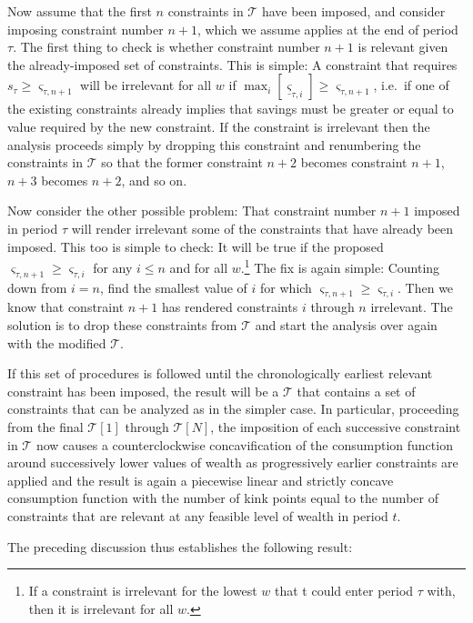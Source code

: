 \documentclass[titlepage]{\econtex}
\providecommand{\sConst}{\varsigma}
\begin{document}
  Now assume that the first $n$ constraints in $\mathcal{T}$ have been imposed, and consider imposing constraint number $n+1$, which we assume applies at the end of period $\tau$.  The first thing to check is whether constraint number $n+1$ is relevant given the already-imposed set of constraints.  This is simple: A constraint that requires $s_{\tau} \geq \sConst_{\tau,n+1}$ will be irrelevant for all $w$ if $\max_{i} [\underline{\sConst}_{\tau,i}] \geq \sConst_{\tau,n+1}$, i.e.\ if one of the existing constraints already implies that savings must be greater or equal to value required by the new constraint.  If the constraint is irrelevant then the analysis proceeds simply by dropping this constraint and renumbering the constraints in $\mathcal{T}$ so that the former constraint $n+2$ becomes constraint $n+1$, $n+3$ becomes $n+2$, and so on.

  Now consider the other possible problem: That constraint number $n+1$ imposed in period $\tau$ will render irrelevant some of the constraints that have already been imposed.  This too is simple to check: It will be true if the proposed $\sConst_{\tau,n+1} \geq \sConst_{\tau,i}$ for any $i \leq n$ and for all $w$.\footnote{If a constraint is irrelevant for the lowest $w$ that t could enter period $\tau$ with, then it is irrelevant for all $w$.} The fix is again simple: Counting down from $i=n$, find the smallest value of $i$ for which $\sConst_{\tau,n+1} \geq \sConst_{\tau,i}$.  Then we know that constraint $n+1$ has rendered constraints $i$ through $n$ irrelevant. The solution is to drop these constraints from $\mathcal{T}$ and start the analysis over again with the modified $\mathcal{T}$. 

  If this set of procedures is followed until the chronologically earliest relevant constraint has been imposed, the result will be a $\mathcal{T}$ that contains a set of constraints that can be analyzed as in the simpler case. In particular, proceeding from the final $\mathcal{T}[1]$ through $\mathcal{T}[N]$, the imposition of each successive constraint in $\mathcal{T}$ now causes a counterclockwise concavification of the consumption function around successively lower values of wealth as progressively earlier constraints are applied and the result is again a piecewise linear and strictly concave consumption function with the number of kink points equal to the number of constraints that are relevant at any feasible level of wealth in period $t$.

  The preceding discussion thus establishes the following result:
\end{document}
